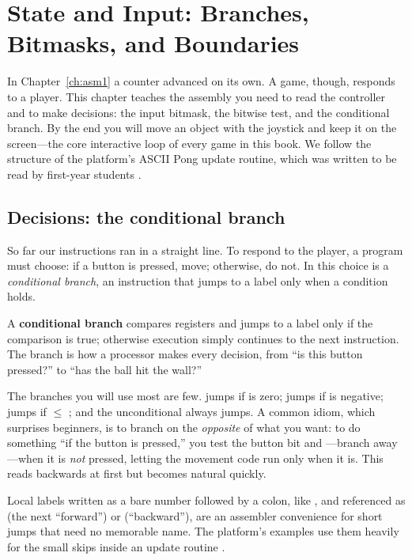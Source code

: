 \chapter{State and Input: Branches, Bitmasks, and Boundaries}
\label{ch:asm2}

In Chapter~\ref{ch:asm1} a counter advanced on its own. A game, though, responds
to a player. This chapter teaches the assembly you need to read the controller
and to make decisions: the input bitmask, the bitwise  test, and the
conditional branch. By the end you will move an object with the joystick and keep
it on the screen---the core interactive loop of every game in this book. We follow
the structure of the platform's ASCII Pong update routine, which was written to be
read by first-year students \citep{prg32tutorialascii,prg32repo}.

\section{Decisions: the conditional branch}

So far our instructions ran in a straight line. To respond to the player, a
program must choose: if a button is pressed, move; otherwise, do not. In \riscv
this choice is a \emph{conditional branch}, an instruction that jumps to a label
only when a condition holds.

\begin{prgconcept}
A \textbf{conditional branch} compares registers and jumps to a label only if the
comparison is true; otherwise execution simply continues to the next instruction.
The branch is how a processor makes every decision, from ``is this button
pressed?'' to ``has the ball hit the wall?''
\end{prgconcept}

The branches you will use most are few.  jumps if  is
zero;  jumps if  is negative; 
jumps if  $\le$ ; and the unconditional  always jumps.
A common idiom, which surprises beginners, is to branch on the \emph{opposite} of
what you want: to do something ``if the button is pressed,'' you test the button
bit and ---branch away---when it is \emph{not} pressed, letting the
movement code run only when it is. This reads backwards at first but becomes
natural quickly.

\begin{prgaside}
Local labels written as a bare number followed by a colon, like , and
referenced as  (the next  ``forward'') or  (``backward''),
are an assembler convenience for short jumps that need no memorable name. The
platform's examples use them heavily for the small skips inside an update routine
\citep{prg32repo}.
\end{prgaside}

